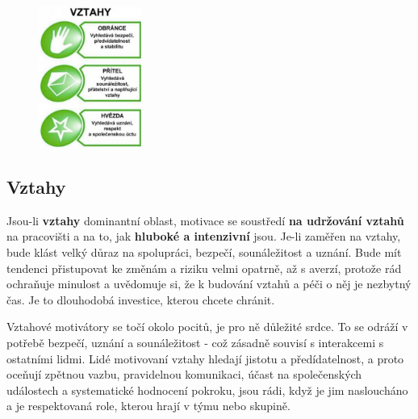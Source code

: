 \documentclass[a4paper,12pt]{report}
\begin{document}
\begin{figure}
\includegraphics[width=0.3\textwidth]{zdroje/motivace-vztahy.png}
\end{figure}
\subsection[Vztahy]{Vztahy}

Jsou-li \textbf{vztahy} dominantní oblast, motivace se soustředí \textbf{na udržování vztahů} na pracovišti a na to, jak \textbf{hluboké a intenzivní} jsou. Je-li zaměřen na vztahy, bude klást velký důraz na spolupráci, bezpečí, sounáležitost a uznání. Bude mít tendenci přistupovat ke změnám a riziku velmi opatrně, až s averzí, protože rád ochraňuje minulost a uvědomuje si, že k budování vztahů a péči o něj je nezbytný čas. Je to dlouhodobá investice, kterou chcete chránit.

Vztahové motivátory se točí okolo pocitů, je pro ně důležité srdce. To se odráží v potřebě bezpečí, uznání a sounáležitost - což zásadně souvisí s interakcemi s ostatními lidmi. Lidé motivovaní vztahy hledají jistotu a předídatelnost, a proto oceňují zpětnou vazbu, pravidelnou komunikaci, účast na společenských událostech a systematické hodnocení pokroku, jsou rádi, když je jim nasloucháno a je respektovaná role, kterou hrají v týmu nebo skupině.

\pagebreak
\end{document}
